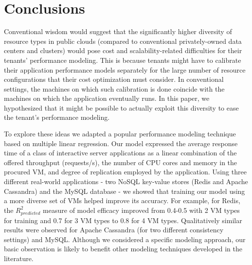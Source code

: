 
%
%

\section{Conclusions}
\label{sec:conclus}
\vspace{10pt}

Conventional wisdom would suggest that the significantly higher diversity of resource types in public clouds (compared to conventional privately-owned data centers and clusters) would pose cost and scalability-related difficulties for their tenants' performance modeling. This is because tenants might have to calibrate their application performance models separately for the large number of resource configurations that their cost optimization must consider. In conventional settings, the machines on which such calibration is done coincide with the machines on which the application eventually runs. In this paper, we hypothesized that it might be possible to actually exploit this diversity to ease the tenant's performance modeling.  

To explore these ideas we adapted a popular performance modeling technique based on multiple linear regression. Our model expressed the average response time of a class of interactive server applications as a linear combination of the offered throughput (requests/s), the number of CPU cores and memory in the procured VM, and degree of replication employed by the application. Using three different real-world applications - two NoSQL key-value stores (Redis and Apache Cassandra) and the MySQL database -  we showed that training our model using a more diverse set of VMs helped improve its accuracy. %
For example, for Redis, the $R^2_{predicted}$ measure of model efficacy improved from 0.4-0.5 with 2 VM types for training and 0.7 for 3 VM types to 0.8 for 4 VM types. Qualitatively similar results were observed for Apache Cassandra (for two different consistency settings) and MySQL. 
Although we considered a specific modeling approach, our basic observation is likely to benefit other modeling techniques developed in the literature. 

